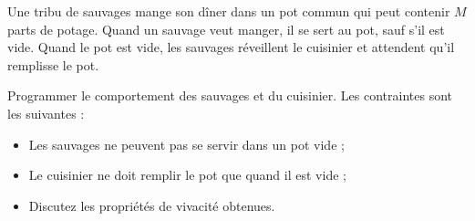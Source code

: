 
\begingroup

\begin{exercice}
  \label{exo:monitors/savages}
  
  Une tribu de sauvages mange son dîner dans un pot commun qui peut contenir
  $M$ parts de potage. Quand un sauvage veut manger, il se sert au pot,
  sauf s'il est vide. Quand le pot est vide, les sauvages réveillent le
  cuisinier et attendent qu'il remplisse le pot.

  Programmer le comportement des sauvages et du cuisinier.
  Les contraintes sont les suivantes :

  \begin{itemize}
  \item Les sauvages ne peuvent pas se servir dans un pot vide ;
  \item Le cuisinier ne doit remplir le pot que quand il est vide ;
  \item Discutez les propriétés de vivacité obtenues.
  \end{itemize}

\end{exercice}

\endgroup
\endinput
